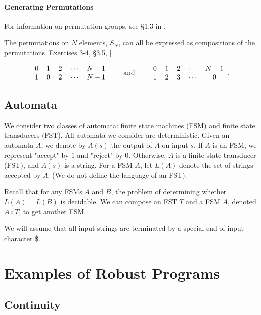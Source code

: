 \documentclass{llncs}
\begin{document}
\paragraph{Generating Permutations}
For information on permutation groups, see \S1.3 in \cite{dummitfoote}.

\makeatletter
\renewcommand{\@cite}[1]{#1}
\makeatother
The permutations on \(N\) elements, \(S_{N}\), can all be expressed as compositions of the permutations [Exercises 3-4, \S3.5, \cite{dummitfoote}]

\[\begin{tabular}{ccccc}
0 & 1 & 2 & \(\dotsm\) & \(N-1\)\\
1 & 0 & 2 & \(\dotsm\) & \(N-1\)
\end{tabular}
\qquad\textrm{and}\qquad
\begin{tabular}{ccccc}
0 & 1 & 2 & \(\dotsm\) & \(N-1\)\\
1 & 2 & 3 & \(\dotsm\) & 0
\end{tabular}.\]
\makeatletter
\renewcommand{\@cite}[1]{[#1]}
\makeatother

\subsection{Automata}
We consider two classes of automata: finite state machines (FSM) and finite state transducers (FST). All automata we consider are deterministic. Given an automata $A$, we denote by $A(s)$ the output of $A$ on input $s$. If $A$ is an FSM, we represent "accept" by $1$ and "reject" by $0$. Otherwise, $A$ is a finite state transducer (FST), and $A(s)$ is a string. For a FSM $A$, let $L(A)$ denote the set of strings accepted by $A$. (We do not define the language of an FST).

Recall that for any FSMs $A$ and $B$, the problem of determining whether $L(A) = L(B)$ is decidable. We can compose an FST $T$ and a FSM $A$, denoted $A \circ T$, to get another FSM. 

We will assume that all input strings are terminated by a special end-of-input character \$.

\section{Examples of Robust Programs}

\subsection{Continuity}
\end{document}
